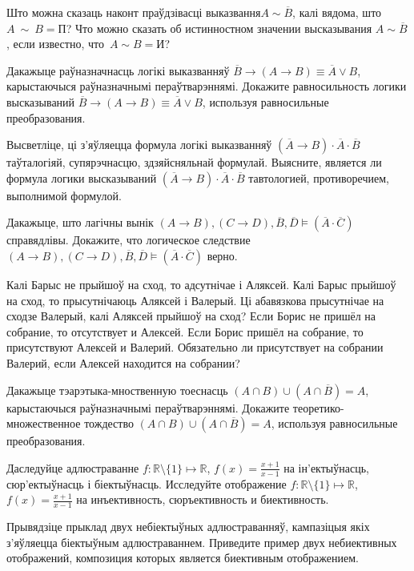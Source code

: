 \begin{problemList}

\problemItemSimple
{Што можна сказаць наконт праўдзівасці выказвання$A \sim \overline{B}$, калі вядома, што~$A~\sim~B = \mbox{П}$?}
{Что можно сказать об истинностном значении высказывания $A \sim \overline{B}$, если известно, что~$A \sim B = \mbox{И}$?}

\bigskip

\problemItemSimple
{Дакажыце раўназначнасць логікі выказванняў $\overline{B} \to (A \to B) \equiv \overline{A} \vee B$,
карыстаючыся раўназначнымі пераўтварэннямі.}
{Докажите равносильность логики высказываний $\overline{B} \to (A \to B) \equiv \overline{A} \vee B$,
используя равносильные преобразования.}

\bigskip

\problemItemSimple
{Высветліце, ці з'яўляецца формула логікі выказванняў $(\overline{A} \to B) \cdot \overline{A} \cdot \overline{B}$
таўталогіяй, супярэчнасцю, здзяйсняльнай формулай.}
{Выясните, является ли формула логики высказываний $(\overline{A} \to B) \cdot \overline{A} \cdot \overline{B}$
тавтологией, противоречием, выполнимой формулой.}

\bigskip

\problemItemSimple
{Дакажыце, што лагічны вынік $(A \to B), (C \to D), \overline{B}, \overline{D} \models (\overline{A} \cdot \overline{C})$ справядлівы.}
{Докажите, что логическое следствие $(A \to B), (C \to D), \overline{B}, \overline{D} \models (\overline{A} \cdot \overline{C})$ верно.}

\bigskip

\problemItemSimple
{Калі Барыс не прыйшоў на сход, то адсутнічае і Аляксей. Калі Барыс прыйшоў на сход, то прысутнічаюць Аляксей і Валерый.
Ці абавязкова прысутнічае на сходзе Валерый, калі Аляксей прыйшоў на сход?}
{Если Борис не пришёл на собрание, то отсутствует и Алексей. Если Борис пришёл на собрание, то присутствуют Алексей и Валерий.
Обязательно ли присутствует на собрании Валерий, если Алексей находится на собрании?}

\bigskip

\problemItemSimple
{Дакажыце тэарэтыка-мноственную тоеснасць $(A \cap B) \cup (A \cap \overline{B}) = A$, карыстаючыся раўназначнымі пераўтварэннямі.}
{Докажите теоретико-множественное тождество $(A \cap B) \cup (A \cap \overline{B}) = A$, используя равносильные преобразования.}

\bigskip

\problemItemSimple
{Даследуйце адлюстраванне $f: \mathbb{R} \setminus \{1\} \mapsto \mathbb{R}$, $f(x) = \frac{x+1}{x-1}$
на ін'ектыўнасць, сюр'ектыўнасць і біектыўнасць. }
{Исследуйте отображение $f: \mathbb{R} \setminus \{1\} \mapsto \mathbb{R}$, $f(x) = \frac{x+1}{x-1}$
на инъективность, сюръективность и биективность.}

\bigskip

\problemItemSimple
{Прывядзіце прыклад двух небіектыўных адлюстраванняў, кампазіцыя якіх з'яўляецца біектыўным адлюстраваннем.}
{Приведите пример двух небиективных отображений, композиция которых является биективным отображением.}

\end{problemList}


